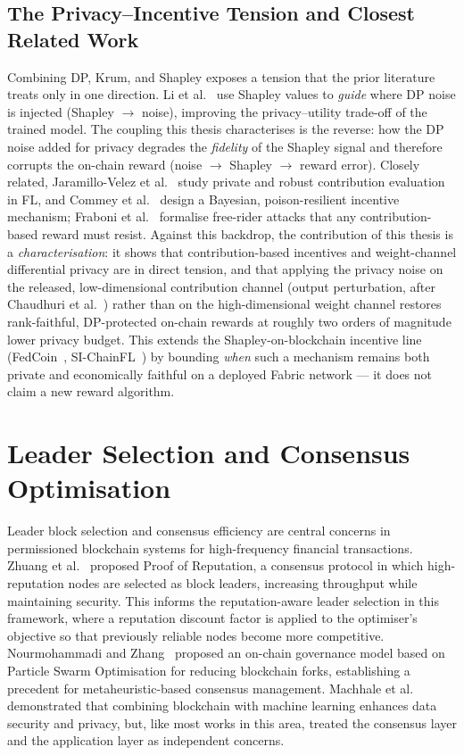 \subsection{The Privacy--Incentive Tension and Closest Related Work}
\label{sec:privacy-incentive-tension}

Combining DP, Krum, and Shapley exposes a tension that the prior literature treats only in one direction. Li et al.~\cite{li2025shapley} use Shapley values to \emph{guide} where DP noise is injected (Shapley $\rightarrow$ noise), improving the privacy--utility trade-off of the trained model. The coupling this thesis characterises is the reverse: how the DP noise added for privacy degrades the \emph{fidelity} of the Shapley signal and therefore corrupts the on-chain reward (noise $\rightarrow$ Shapley $\rightarrow$ reward error). Closely related, Jaramillo-Velez et al.~\cite{jaramillo2026} study private and robust contribution evaluation in FL, and Commey et al.~\cite{commey2025} design a Bayesian, poison-resilient incentive mechanism; Fraboni et al.~\cite{fraboni2020} formalise free-rider attacks that any contribution-based reward must resist. Against this backdrop, the contribution of this thesis is a \emph{characterisation}: it shows that contribution-based incentives and weight-channel differential privacy are in direct tension, and that applying the privacy noise on the released, low-dimensional contribution channel (output perturbation, after Chaudhuri et al.~\cite{chaudhuri2011}) rather than on the high-dimensional weight channel restores rank-faithful, DP-protected on-chain rewards at roughly two orders of magnitude lower privacy budget. This extends the Shapley-on-blockchain incentive line (FedCoin~\cite{fedcoin2020}, SI-ChainFL~\cite{zhao2026sichainfl}) by bounding \emph{when} such a mechanism remains both private and economically faithful on a deployed Fabric network --- it does not claim a new reward algorithm.

\section{Leader Selection and Consensus Optimisation}

Leader block selection and consensus efficiency are central concerns in permissioned blockchain systems for high-frequency financial transactions. Zhuang et al.~\cite{zhuang2019} proposed Proof of Reputation, a consensus protocol in which high-reputation nodes are selected as block leaders, increasing throughput while maintaining security. This informs the reputation-aware leader selection in this framework, where a reputation discount factor is applied to the optimiser's objective so that previously reliable nodes become more competitive. Nourmohammadi and Zhang~\cite{9945966} proposed an on-chain governance model based on Particle Swarm Optimisation for reducing blockchain forks, establishing a precedent for metaheuristic-based consensus management. Machhale et al.~\cite{10575309} demonstrated that combining blockchain with machine learning enhances data security and privacy, but, like most works in this area, treated the consensus layer and the application layer as independent concerns.

